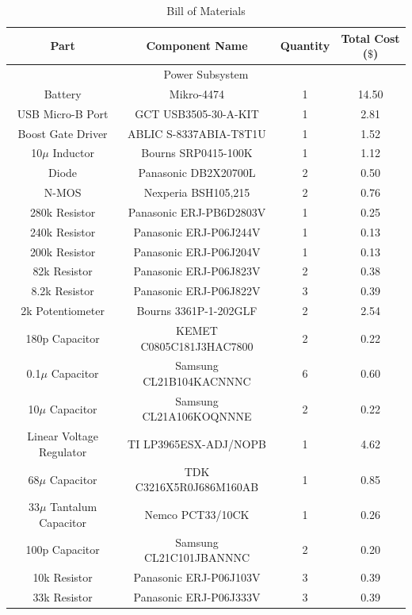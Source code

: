\documentclass[12pt]{article}
\begin{document}
\begin{table}[!h]
	\caption{Bill of Materials}
	\label{tab:block_comps}
	\centering
	{\small
	\begin{tabular}{ |c|c|c|c| } 
 		\hline
 		\textbf{Part} & \textbf{Component Name} & \textbf{Quantity} & \textbf{Total Cost} ($\$$) \\
 		\hline
 		\hline
 		\multicolumn{4}{|c|}{Power Subsystem} \\
 		\hline
 		Battery & Mikro-4474 & 1 & 14.50 \\
 		USB Micro-B Port & GCT USB3505-30-A-KIT & 1 & 2.81 \\
 		Boost Gate Driver & ABLIC S-8337ABIA-T8T1U & 1 & 1.52 \\
 		10$\mu$ Inductor & Bourns SRP0415-100K & 1 & 1.12 \\
 		Diode & Panasonic DB2X20700L & 2 & 0.50 \\
 		N-MOS & Nexperia BSH105,215 & 2 & 0.76 \\
 		280k Resistor & Panasonic ERJ-PB6D2803V & 1 & 0.25 \\
 		240k Resistor & Panasonic ERJ-P06J244V & 1 & 0.13 \\
 		200k Resistor & Panasonic ERJ-P06J204V & 1 & 0.13 \\
 		82k Resistor & Panasonic ERJ-P06J823V & 2 & 0.38 \\
 		8.2k Resistor & Panasonic ERJ-P06J822V & 3 & 0.39 \\
 		2k Potentiometer & Bourns 3361P-1-202GLF & 2 & 2.54 \\
 		180p Capacitor & KEMET C0805C181J3HAC7800 & 2 & 0.22 \\
 		0.1$\mu$ Capacitor & Samsung CL21B104KACNNNC & 6 & 0.60 \\
 		10$\mu$ Capacitor & Samsung CL21A106KOQNNNE & 2 & 0.22 \\
 		Linear Voltage Regulator & TI LP3965ESX-ADJ/NOPB & 1 & 4.62 \\
 		68$\mu$ Capacitor & TDK C3216X5R0J686M160AB & 1 & 0.85 \\
 		33$\mu$ Tantalum Capacitor & Nemco PCT33/10CK & 1 & 0.26 \\
 		100p Capacitor & Samsung CL21C101JBANNNC & 2 & 0.20 \\
 		10k Resistor & Panasonic ERJ-P06J103V & 3 & 0.39 \\
 		33k Resistor & Panasonic ERJ-P06J333V & 3 & 0.39 \\

\end{tabular}}
\end{table}
\end{document}
